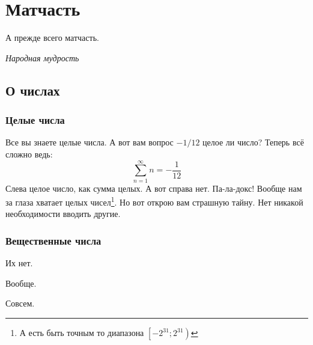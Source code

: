 \chapter{Матчасть}
\epigraph{{А прежде всего матчасть.}}{\textit{Народная мудрость}}
\section{О числах}
\subsection{Целые числа}
Все вы знаете целые числа. А вот вам вопрос $ -1/12 $ целое ли число?
Теперь всё сложно ведь:
$$
\sum_{n=1}^{\infty} n = -\frac{1}{12}
$$
Слева целое число, как сумма целых. А вот справа нет. Па-ла-докс!
Вообще нам за глаза хватает целых чисел\footnote{А есть быть точным то диапазона 
	$ \left[-2^{31};2^{31}\right) $}. Но вот открою вам страшную тайну. Нет никакой необходимости вводить другие.
\subsection{Вещественные числа}
Их нет.

 Вообще.
 
 \;\;\;\; Совсем.
